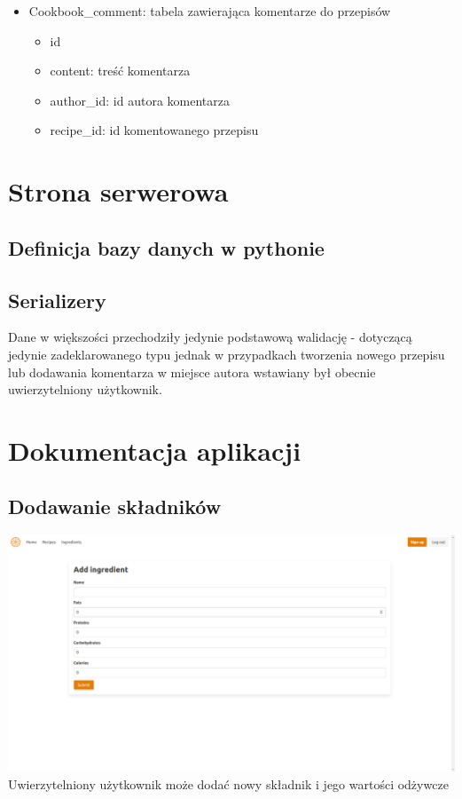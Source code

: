 \documentclass[11pt]{article}
\begin{document}
\begin{itemize}
\begin{itemize}
    \end{itemize}
    \item Cookbook\_comment: tabela zawierająca komentarze do przepisów
    \begin{itemize}
        \item id
        \item content: treść komentarza
        \item author\_id: id autora komentarza
        \item recipe\_id: id komentowanego przepisu
    \end{itemize}
\end{itemize}


\section{Strona serwerowa}
\subsection{Definicja bazy danych w pythonie}

\subsection{Serializery}
Dane w większości przechodziły jedynie podstawową walidację - dotyczącą jedynie 
zadeklarowanego typu jednak w przypadkach tworzenia nowego przepisu lub dodawania komentarza
w miejsce autora wstawiany był obecnie uwierzytelniony użytkownik.


\section{Dokumentacja aplikacji}
\subsection{Dodawanie składników}
\includegraphics[width=15.5cm]{add_ingredient.png}
\newline
Uwierzytelniony użytkownik może dodać nowy składnik i jego wartości odżywcze
\end{document}
